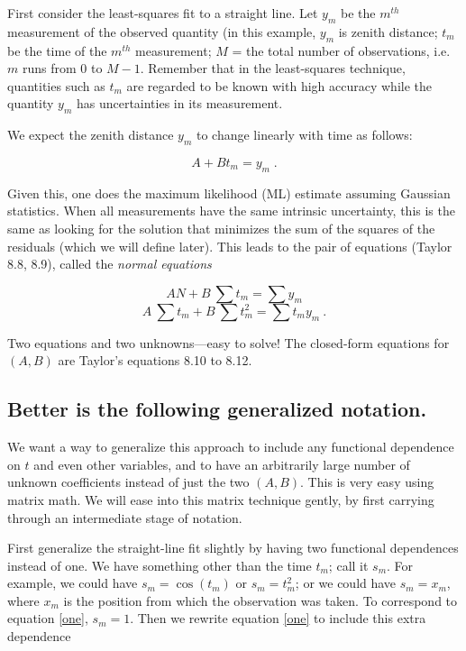 \documentclass[psfig,preprint]{aastex}
\begin{document}
	First consider the least-squares fit to a straight line.  Let
$y_m$ be the $m^{th}$ measurement of the observed quantity (in this
example, $y_m$ is zenith distance; $t_m$ be the time of the
$m^{th}$ measurement; $M$ = the total number of observations, i.e.\ $m$
runs from 0 to $M-1$.  Remember that in the least-squares technique,
quantities such as $t_m$ are regarded to be known with high accuracy
while the quantity $y_m$ has uncertainties in its measurement. 

	We expect the zenith distance $y_m$ to change linearly with
time as follows:

\begin{equation} \label{one}
A + B t_m = y_m \; .
\end{equation}

\noindent Given this, one does the maximum likelihood (ML) estimate assuming
Gaussian statistics. When all measurements have the same intrinsic
uncertainty, this is the same as looking for the solution that minimizes
the sum of the squares of the residuals (which we will define later). 
This leads to the pair of equations (Taylor 8.8, 8.9), called the {\it
normal equations}

\begin{mathletters} \label{normalone}
\begin{equation}
AN + B \ \sum t_m = \sum y_m
\end{equation}
\begin{equation}
A \ \sum t_m + B \ \sum t_m^2 = \sum t_m y_m \ .
\end{equation}
\end{mathletters}

\noindent Two equations and two unknowns---easy to solve! The
closed-form equations for $(A,B)$ are Taylor's equations 8.10 to 8.12.

\subsection{Better is the following generalized notation.}

	We want a way to generalize this approach to include any
functional dependence on $t$ and even other variables, and to have an
arbitrarily large number of unknown coefficients instead of just the two
$(A,B)$. This is very easy using matrix math.  We will ease into this
matrix technique gently, by first  carrying through an intermediate
stage of notation. 

	First generalize the straight-line fit slightly by having two
functional dependences instead of one. We have something other than the
time $t_m$; call it $s_m$. For example, we could have $s_m = \cos (t_m)$
or $s_m = t_m^2$; or we could have $s_m = x_m$, where $x_m$ is the
position from which the observation was taken. To correspond to equation
\ref{one}, $s_m = 1$. Then we rewrite equation \ref{one} to include this
extra dependence
\end{document}
